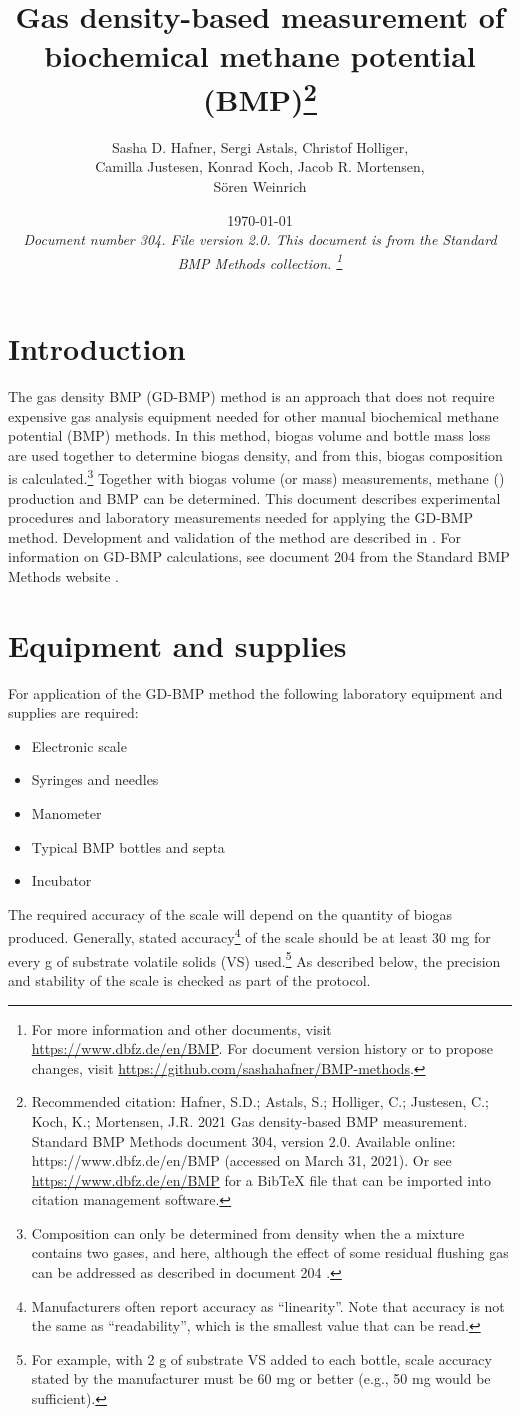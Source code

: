\documentclass[]{article}
\title {Gas density-based measurement of biochemical methane potential (BMP)\footnote{
  Recommended citation: 
Hafner, S.D.; Astals, S.; Holliger, C.; Justesen, C.; Koch, K.; Mortensen, J.R. 2021 Gas density-based BMP measurement. Standard BMP Methods document 304, version 2.0. Available online: https://www.dbfz.de/en/BMP (accessed on March 31, 2021).
\newline
  Or see \url{https://www.dbfz.de/en/BMP} for a BibTeX file that can be imported into citation management software.
}
}
\author{Sasha D. Hafner, Sergi Astals, Christof Holliger, \\ Camilla Justesen, Konrad Koch, Jacob R. Mortensen, \\ S\"oren Weinrich}
\date{\today \\
\bigskip
\textit{
  Document number 304.
  File version 2.0. 
  This document is from the Standard BMP Methods collection.
    \footnote{For more information and other documents, visit \url{https://www.dbfz.de/en/BMP}. 
    For document version history or to propose changes, visit \url{https://github.com/sashahafner/BMP-methods}.}
}
}
\begin{document}
\maketitle

\section{Introduction}
The gas density BMP (GD-BMP) method is an approach that does not require expensive gas analysis equipment needed for other manual biochemical methane potential (BMP) methods.
In this method, biogas volume and bottle mass loss are used together to determine biogas density, and from this, biogas composition is calculated.\footnote{Composition can only be determined from density when the a mixture contains two gases,  and  here, although the effect of some residual flushing gas can be addressed as described in document 204 \citep{BMPdoc204gasdens}.}
Together with biogas volume (or mass) measurements, methane () production and BMP can be determined.
This document describes experimental procedures and laboratory measurements needed for applying the GD-BMP method.
Development and validation of the method are described in \citet{justesenDevelopmentValidationLowcost2019}.
For information on GD-BMP calculations, see document 204 from the Standard BMP Methods website \citep{BMPdoc204gasdens}. 

\section{Equipment and supplies}
For application of the GD-BMP method the following laboratory equipment and supplies are required:
\begin{itemize}
    \item Electronic scale
    \item Syringes and needles
    \item Manometer
    \item Typical BMP bottles and septa
    \item Incubator
\end{itemize}

The required accuracy of the scale will depend on the quantity of biogas produced. 
Generally, stated accuracy\footnote{
  Manufacturers often report accuracy as ``linearity''. 
  Note that accuracy is not the same as ``readability'', which is the smallest value that can be read. 
} of the scale should be at least 30 mg for every g of substrate volatile solids (VS) used.\footnote{
  For example, with 2 g of substrate VS added to each bottle, scale accuracy stated by the manufacturer must be 60 mg or better (e.g., 50 mg would be sufficient).
}
As described below, the precision and stability of the scale is checked as part of the protocol.
\end{document}
